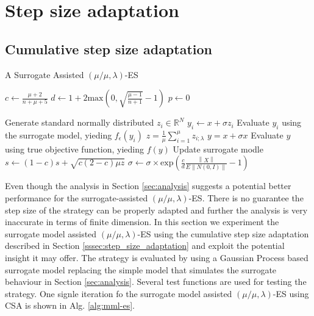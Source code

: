 \section{Step size adaptation}\label{sec:step_size_adaptation}

\subsection{Cumulative step size adaptation}

\begin{algorithm}
\caption{A Surrogate Assisted $(\mu/\mu,\lambda)$-ES}
\label{alg:mml-es}
\begin{algorithmic}[1]
\STATE $c \leftarrow  \frac{\mu +2}{n+\mu+5}$ 
\STATE $d \leftarrow 1 + 2 \text{max}(0, \sqrt{\frac{\mu - 1}{n+1} } - 1 ) $
\STATE $p \leftarrow 0$

		\STATE Generate standard normally distributed $z_i \in \mathbb{R}^N $
		\STATE $y_i \leftarrow x + \sigma z_i$
		\STATE Evaluate $y_i$ using the surrogate model, yieding $f_{\epsilon}(y_i)$
	\ENDFOR
	\STATE $z = \frac{1}{\mu} \sum_{i=1}^{\mu} z_{i;\lambda}$
	\STATE $y = x + \sigma x$
	\STATE Evaluate $y$ using true objective function, yieding $f(y)$
	\STATE Update surrogate modle 
	\STATE $s \leftarrow (1-c)s + \sqrt{ c(2-c) \mu z}$
	\STATE $\sigma \leftarrow \sigma \times \text{exp} \left(\frac{c}{d} \frac{\left\lVert X \right\rVert} { E \left\lVert N(0,I) \right\rVert} -1 \right )$
		

\ENDWHILE

\end{algorithmic}
\end{algorithm}

Even though the analysis in Section \ref{sec:analysis} suggests a potential better performance for the surrogate-assisted $(\mu/\mu,\lambda)$-ES. There is no guarantee the step size of the strategy can be properly adapted and further the analysis is very inaccurate in terms of finite dimension. In this section we experiment the surrogate model assisted $(\mu/\mu,\lambda)$-ES using the cumulative step size adaptation described in Section \ref{sssec:step_size_adaptation} and exploit the potential insight it may offer. The strategy is evaluated by using a Gaussian Process based surrogate model replacing the simple model that simulates the surrogate behaviour in Section \ref{sec:analysis}. Several test functions are used for testing the strategy. 
One signle iteration fo the surrogate model assisted $(\mu/\mu,\lambda)$-ES using CSA is shown in Alg. \ref{alg:mml-es}. 

